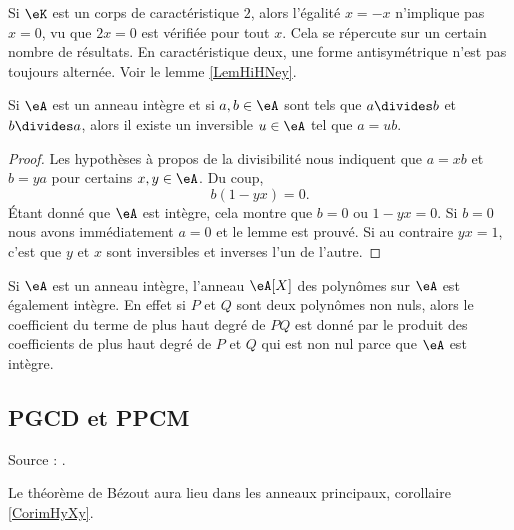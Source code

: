 \begin{example}
    Si \( \eK\) est un corps de caractéristique \( 2\), alors l'égalité \( x=-x\) n'implique pas \( x=0\), vu que \( 2x=0\) est vérifiée pour tout \( x\). Cela se répercute sur un certain nombre de résultats. En caractéristique deux, une forme antisymétrique n'est pas toujours alternée. Voir le lemme \ref{LemHiHNey}.
\end{example}


\begin{lemma}\label{LemRmVTRq}
    Si \( \eA\) est un anneau intègre et si \( a,b\in \eA\) sont tels que \( a\divides b\) et \( b\divides a\), alors il existe un inversible \( u\in \eA\) tel que \( a=ub\).
\end{lemma}

\begin{proof}
    Les hypothèses à propos de la divisibilité nous indiquent que \( a=xb\) et \( b=ya\) pour certains \( x,y\in \eA\). Du coup,
    \begin{equation}
        b(1-yx)=0.
    \end{equation}
    Étant donné que \( \eA\) est intègre, cela montre que \( b=0\) ou \( 1-yx=0\). Si \( b=0\) nous avons immédiatement \( a=0\) et le lemme est prouvé. Si au contraire \( yx=1\), c'est que \( y\) et \( x\) sont inversibles et inverses l'un de l'autre.
\end{proof}

\begin{example}     \label{ExybCZyl}
    Si \( \eA\) est un anneau intègre, l'anneau \( \eA[X]\) des polynômes sur \( \eA\) est également intègre. En effet si \( P\) et \( Q\) sont deux polynômes non nuls, alors le coefficient du terme de plus haut degré de \( PQ\) est donné par le produit des coefficients de plus haut degré de \( P\) et \( Q\) qui est non nul parce que \( \eA\) est intègre.
\end{example}

\subsection{PGCD et PPCM}
Source : \cite{XPXxPl}.

Le théorème de Bézout aura lieu dans les anneaux principaux, corollaire \ref{CorimHyXy}.

